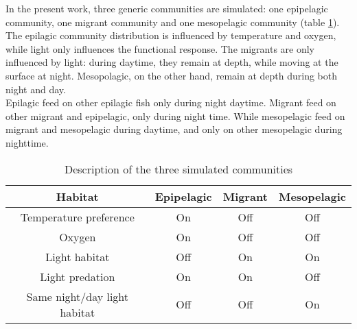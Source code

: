 In the present work, three generic communities are simulated: one epipelagic community, one migrant community and one mesopelagic community (table \ref{t:com-habitat}). 
The epilagic community distribution is influenced by temperature and oxygen, while light only influences the functional response. The 
migrants are only influenced by light: during daytime, they remain at depth, while moving at the 
surface at night. Mesopolagic, on the other hand, remain at depth during both night and day.\\

Epilagic feed on other epilagic fish only during night daytime. Migrant feed on other migrant and epipelagic, only during night time. While mesopelagic feed on migrant and mesopelagic during daytime, and only on other mesopelagic during nighttime. \\

\begin{table}
\begin{tabular}{cccc}
     Habitat & Epipelagic & Migrant & Mesopelagic \\
     \hline
     \hline
      Temperature preference & On & Off & Off\\
      Oxygen & On & Off & Off \\
      Light habitat & Off & On & On \\
      Light predation & On & On & Off \\
      Same night/day light habitat  & Off & Off & On \\
\end{tabular}
\caption{Description of the three simulated communities}
\label{t:com-habitat}
\end{table}

